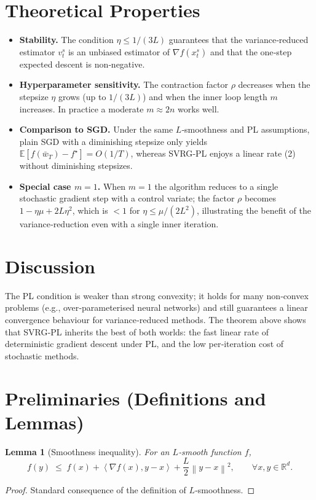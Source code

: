 \documentclass{article}
\newtheorem{lemma}{Lemma}[section]
\newcommand{\EE}{\mathbb{E}}
\newcommand{\RR}{\mathbb{R}}
\newcommand{\grad}{\nabla}
\newcommand{\norm}[1]{\left\|#1\right\|}
\newcommand{\inner}[2]{\left\langle #1,#2\right\rangle}
\begin{document}
\section*{Theoretical Properties}
\begin{itemize}[leftmargin=*,labelsep=5mm]
\item \textbf{Stability.} The condition $\eta\le 1/(3L)$ guarantees that the
variance‑reduced estimator $v_{t}^{s}$ is an unbiased estimator of $\grad f(x_{t}^{s})$
and that the one‑step expected descent is non‑negative.
\item \textbf{Hyperparameter sensitivity.}
The contraction factor $\rho$ decreases when the stepsize $\eta$ grows (up to $1/(3L)$)
and when the inner loop length $m$ increases. In practice a moderate $m\approx 2n$ works well.
\item \textbf{Comparison to SGD.}
Under the same $L$‑smoothness and PL assumptions, plain SGD with a diminishing stepsize only yields
$\EE[f(\bar w_T)-f^{\star}]=O(1/T)$, whereas SVRG‑PL enjoys a linear rate (2) without diminishing stepsizes.
\item \textbf{Special case $m=1$.}
When $m=1$ the algorithm reduces to a single stochastic gradient step with a control variate;
the factor $\rho$ becomes $1-\eta\mu+2L\eta^{2}$, which is $<1$ for $\eta\le\mu/(2L^{2})$,
illustrating the benefit of the variance‑reduction even with a single inner iteration.
\end{itemize}

\section*{Discussion}
The PL condition is weaker than strong convexity; it holds for many non‑convex problems
(e.g., over‑parameterised neural networks) and still guarantees a linear convergence
behaviour for variance‑reduced methods. The theorem above shows that SVRG‑PL inherits the
best of both worlds: the fast linear rate of deterministic gradient descent under PL,
and the low per‑iteration cost of stochastic methods.

\newpage
\section*{Preliminaries (Definitions and Lemmas)}
\begin{lemma}[Smoothness inequality]\label{lem:smooth}
For an $L$‑smooth function $f$,
\[
f(y)\;\le\; f(x)+\inner{\grad f(x)}{y-x}+\frac{L}{2}\norm{y-x}^{2},
\qquad\forall x,y\in\RR^{d}.
\tag{3}
\]
\end{lemma}
\begin{proof}
Standard consequence of the definition of $L$‑smoothness. \qedhere
\end{proof}
\end{document}
